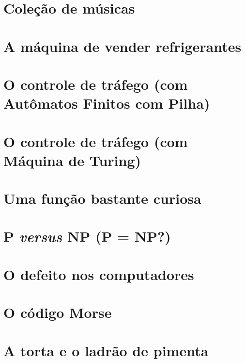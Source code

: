 \newcommand{\tituloProblema}[2]{\textbf{\\#1. #2\\}}
\acresetall
\label{cap-problemas-textos}
\section{Coleção de músicas}

\newpage
\section{A máquina de vender refrigerantes}

\newpage
\section{O controle de tráfego (com Autômatos Finitos com Pilha)}

\newpage
\section{O controle de tráfego (com Máquina de Turing)}

\newpage
\section{Uma função bastante curiosa}

\newpage
\section{P \textit{versus} NP (P = NP?)}

\newpage
\section{O defeito nos computadores}

\newpage
\section{O código Morse}

\newpage
\section{A torta e o ladrão de pimenta}

